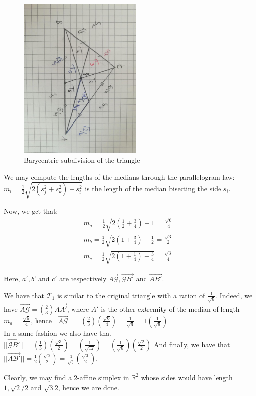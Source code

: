 \documentclass{article}
\newcommand{\numberset}{\mathbb}
\newcommand{\R}{\numberset{R}}
\begin{document}
\begin{figure}
		  \includegraphics[width=6cm]{pic1ass4at1.jpg}
		  \caption{Barycentric subdivision of the triangle}
\end{figure}

We may compute the lengths of the medians through the parallelogram law: $m_i=\frac{1}{2}\sqrt{2(s_j^2+s_k^2)-s_i^2}$ is the length of the median bisecting the side $s_i$.

Now, we get that:
\begin{align*}
		m_a=\frac{1}{2}\sqrt{2(\frac{1}{2}+\frac{3}{4})-1}=\frac{\sqrt{6}}{4} \\
		m_b=\frac{1}{2}\sqrt{2(1+\frac{3}{4})-\frac{1}{2}}=\frac{\sqrt{3}}{2} \\
		m_c=\frac{1}{2}\sqrt{2(1+\frac{1}{4})-\frac{3}{4}}=\frac{\sqrt{3}}{4}
\end{align*}

Here, $a',b'$ and $c'$ are respectively $\overrightarrow{A\mathcal{G}},\overrightarrow{\mathcal{G}B'}$ and $\overrightarrow{AB'}$.

We have that $\mathcal{T}_{1}$ is similar to the original triangle with a ration of $\frac{1}{\sqrt{6}}$. Indeed, we have $\overrightarrow{A\mathcal{G}}=(\frac{2}{3})\overrightarrow{AA'}$, where $A'$ is the other extremity of the median of length $m_{a}=\frac{\sqrt{6}}{4}$, hence $||\overrightarrow{A\mathcal{G}}||=(\frac{2}{3})(\frac{\sqrt{6}}{4})=\frac{1}{\sqrt6}=1(\frac{1}{\sqrt6})$\\
In a same fashion we also have that $||\overrightarrow{\mathcal{G} B'}||=(\frac{1}{3})(\frac{\sqrt{3}}{2})=(\frac{1}{\sqrt{12}})=(\frac{1}{\sqrt{6}})(\frac{\sqrt{2}}{2})$
And finally, we have that $|| \overrightarrow{A\mathcal{B'}}||=\frac{1}{2}(\frac{\sqrt2}{2})=\frac{1}{\sqrt6}(\frac{\sqrt3}{2})$.

Clearly, we may find a 2-affine simplex in $\R^2$ whose sides would have length $1,\sqrt{2}/2$ and $\sqrt{3}{2}$, hence we are done.
\end{document}
